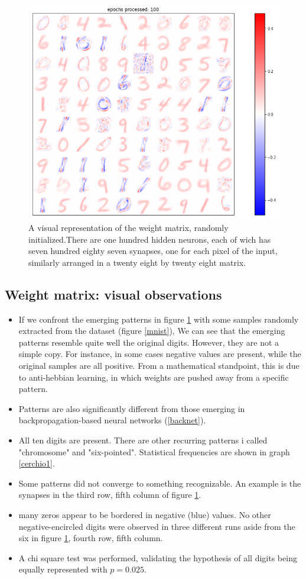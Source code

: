 \documentclass[a4paper]{report}
\begin{document}
\begin{figure} [H]
    \centering
    \includegraphics [width=12cm ] {h/uu_heatmap.png}
    \caption{A visual representation of the weight matrix, randomly initialized.There are one hundred hidden neurons, each of wich has seven hundred eighty seven synapses, one for each pixel of the input, similarly arranged in a twenty eight by twenty eight matrix.}
    \label{heatmap}
\end{figure}

\subsection{Weight matrix: visual observations}

\begin{itemize}
    \item If we confront the emerging patterns in figure \ref{heatmap} with some samples randomly extracted from the dataset (figure \ref{mnist}), We can see that the emerging patterns resemble quite well the original digits. However, they are not a simple copy. For instance, in some cases negative values are present, while the original samples are all positive. From a mathematical standpoint, this is due to anti-hebbian learning, in which weights are pushed away from a specific pattern.
    \item Patterns are also significantly different from those emerging in backpropagation-based neural networks (\ref{backnet}).
    \item All ten digits are present. There are other recurring patterns i called "chromosome" and "six-pointed". Statistical frequencies are shown in graph \ref{cerchio1}.
    \item Some patterns did not converge to something recognizable. An example is the synapses in the third row, fifth column of figure \ref{heatmap}.
    \item many zeros appear to be bordered in negative (blue) values. No other negative-encircled digits were observed in three different runs aside from the six in figure \ref{heatmap}, fourth row, fifth column.
    \item A chi square test was performed, validating the hypothesis of all digits being equally represented with $p  = 0.025$.
    \end{itemize}
\end{document}
